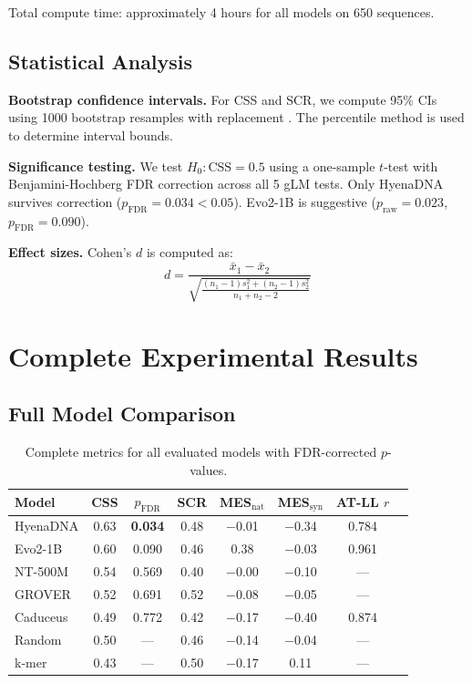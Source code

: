 \documentclass{article}
\newcommand{\css}{\text{CSS}}
\begin{document}
Total compute time: approximately 4 hours for all models on 650 sequences.

\subsection{Statistical Analysis}

\textbf{Bootstrap confidence intervals.} For CSS and SCR, we compute 95\% CIs using 1000 bootstrap resamples with replacement \citep{efron1993bootstrap}. The percentile method is used to determine interval bounds.

\textbf{Significance testing.} We test $H_0: \css = 0.5$ using a one-sample $t$-test with Benjamini-Hochberg FDR correction \citep{benjamini1995controlling} across all 5 gLM tests. Only HyenaDNA survives correction ($p_{\text{FDR}} = 0.034 < 0.05$). Evo2-1B is suggestive ($p_{\text{raw}} = 0.023$, $p_{\text{FDR}} = 0.090$).

\textbf{Effect sizes.} Cohen's $d$ \citep{cohen1988statistical} is computed as:
\begin{equation}
d = \frac{\bar{x}_1 - \bar{x}_2}{\sqrt{\frac{(n_1-1)s_1^2 + (n_2-1)s_2^2}{n_1+n_2-2}}}
\end{equation}

\section{Complete Experimental Results}
\label{app:results}

\subsection{Full Model Comparison}

\begin{table}[H]
\caption{Complete metrics for all evaluated models with FDR-corrected $p$-values.}
\label{tab:full_metrics}
\begin{center}
\small
\begin{tabular}{lccccccc}
\toprule
Model & CSS & $p_{\text{FDR}}$ & SCR & MES$_\text{nat}$ & MES$_\text{syn}$ & AT-LL $r$ \\
\midrule
HyenaDNA & 0.63 & \textbf{0.034} & 0.48 & $-$0.01 & $-$0.34 & 0.784 \\
Evo2-1B & 0.60 & 0.090 & 0.46 & 0.38 & $-$0.03 & 0.961 \\
NT-500M & 0.54 & 0.569 & 0.40 & $-$0.00 & $-$0.10 & --- \\
GROVER & 0.52 & 0.691 & 0.52 & $-$0.08 & $-$0.05 & --- \\
Caduceus & 0.49 & 0.772 & 0.42 & $-$0.17 & $-$0.40 & 0.874 \\
\midrule
Random & 0.50 & --- & 0.46 & $-$0.14 & $-$0.04 & --- \\
k-mer & 0.43 & --- & 0.50 & $-$0.17 & 0.11 & --- \\
\bottomrule
\end{tabular}
\end{center}
\end{table}
\end{document}
